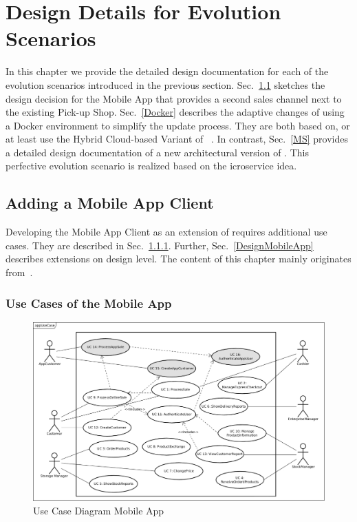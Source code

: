 
\chapter{Design Details for Evolution Scenarios}
\label{c:design}
In this chapter we provide the detailed design documentation for each of the evolution scenarios introduced in the previous section. 
Sec.~\ref{App} sketches the design decision for the Mobile App that provides a second sales channel next to the existing Pick-up Shop. Sec.~\ref{Docker} describes the adaptive changes of using a Docker environment to simplify the update process. They are both based on, or at least use the Hybrid Cloud-based Variant of \CoCoME~\cite{HeinrichRostamiReussner2016_1000052688}. In contrast, Sec.~\ref{MS} provides a detailed design documentation of a new architectural version of \CoCoME. This perfective evolution scenario is realized based on the icroservice idea.

\section{Adding a Mobile App Client} 
\label{App}
Developing the Mobile App Client as an extension of \CoCoME requires additional use cases. They are described in Sec.~\ref{UseCasesMobileApp}. Further, Sec.~\ref{DesignMobileApp} describes extensions on design level. The content of this chapter mainly originates from~\cite{schnabel}.

\subsection{Use Cases of the Mobile App}
\label{UseCasesMobileApp}
\begin{figure}[t]
	\includegraphics[width=\textwidth]{img/appUseCase.jpg}
	\caption{Use Case Diagram \CoCoME Mobile App}
\end{figure}

